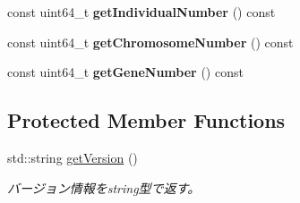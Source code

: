 \begin{DoxyCompactItemize}
\item 
\mbox{\label{class_g_a_1_1_options_a5c530fdecc7fd52b489f0b22dde66690}} 
const uint64\+\_\+t {\bfseries get\+Individual\+Number} () const
\item 
\mbox{\label{class_g_a_1_1_options_a031bbb8da0909142db58c05007b3b156}} 
const uint64\+\_\+t {\bfseries get\+Chromosome\+Number} () const
\item 
\mbox{\label{class_g_a_1_1_options_a0731390ca7c6122ef353dcc364078ec2}} 
const uint64\+\_\+t {\bfseries get\+Gene\+Number} () const
\end{DoxyCompactItemize}
\subsection*{Protected Member Functions}
\begin{DoxyCompactItemize}
\item 
\mbox{\label{class_g_a_1_1_options_a8ed5817b7aa19cd6d6797552b335f2b6}} 
std\+::string \mbox{\hyperlink{class_g_a_1_1_options_a8ed5817b7aa19cd6d6797552b335f2b6}{get\+Version}} ()
\begin{DoxyCompactList}\small\item\em バージョン情報をstring型で返す。 \end{DoxyCompactList}\end{DoxyCompactItemize}
